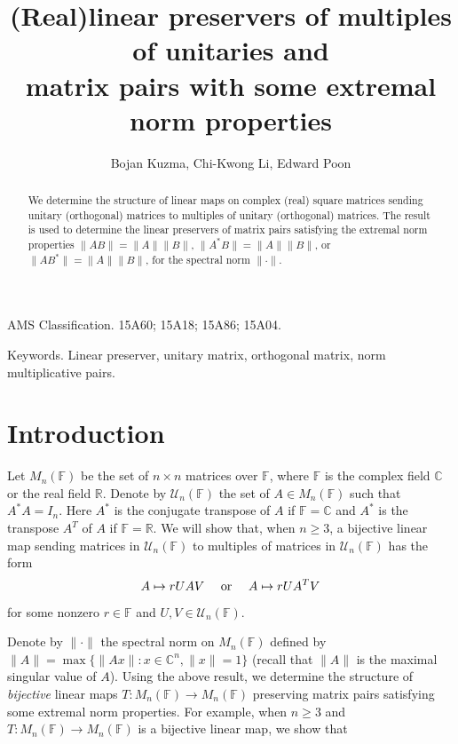 \documentclass[11pt]{article}
\numberwithin{equation}{section}
\def\IF{{\mathbb F}}
\def\IC{{\mathbb C}}
\def\IR{{\mathbb R}}
\begin{document}
 \jot

\title{(Real)linear preservers of multiples of unitaries and \\
matrix pairs with some extremal norm properties}

\author{Bojan Kuzma, Chi-Kwong Li, Edward Poon}
\date{}
\maketitle
\begin{abstract}  We determine the structure of linear maps on complex (real) square matrices
sending unitary (orthogonal) matrices to multiples of unitary (orthogonal) matrices. The result
is used to determine the linear preservers of
matrix pairs satisfying the extremal norm properties $\|AB\| = \|A\| \|B\|$,
$\|A^*B\| = \|A\| \|B\|$, or $\|AB^*\| = \|A\| \|B\|$,
for the spectral norm $\|\cdot\|$.

\end{abstract}

AMS Classification.  15A60; 15A18; 15A86; 15A04.

Keywords. Linear preserver, unitary matrix, orthogonal matrix, norm multiplicative pairs.

\section{Introduction}


Let $M_n(\IF)$ be the set of $n\times n$ matrices over $\IF$, where $\IF$ is the complex field  $\IC$ or the real field $\IR$.
    Denote by ${\mathcal U}_n(\IF)$ the set of $A \in M_n(\IF)$ such that $A^*A = I_n$. Here
$A^*$ is the conjugate transpose of $A$ if $\IF = \IC$ and $A^*$ is the transpose $A^T$ of $A$ if $\IF = \IR$.
We will show that, when $n \ge 3$, a bijective linear map sending matrices in ${\mathcal U}_n(\IF)$ to multiples of matrices in
${\mathcal U}_n(\IF)$ has the form
$$A \mapsto r UAV \quad \hbox{ or } \quad A \mapsto r UA^TV$$
for some nonzero $r \in \IF$ and $U, V \in {\mathcal U}_n(\IF)$.


Denote by $\|\cdot\|$ the spectral norm on $M_n(\IF)$ defined by $\|A\|  = \max\{ \|Ax\|: x \in \IC^n, \|x\| = 1\}$ (recall that $\|A\|$ is the maximal singular value of $A$).
Using the above result, we determine the structure of  \emph{bijective} linear maps $T\colon M_n(\IF)\rightarrow M_n(\IF)$
preserving matrix pairs
satisfying some extremal norm properties. For example, when $n \ge 3$
and  $T\colon  M_n(\IF)\rightarrow M_n(\IF)$ is a bijective linear map, we show that
\end{document}

